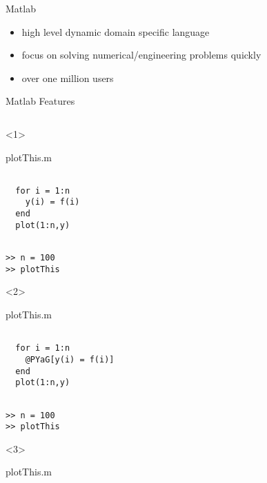 
\begin{frame}{Matlab}


\begin{itemize}
\pause \item high level dynamic domain specific language
\pause \item focus on solving numerical/engineering problems quickly
\pause \item over one million users
\end{itemize}

\end{frame}
\begin{frame}[fragile]{Matlab Features}
  \begin{columns}
    \begin{column}[T]{5cm}
      \begin{onlyenv}<1>
        \begin{block}{plotThis.m}
          \begin{Verbatim}[commandchars=@\[\]]

  for i = 1:n
    y(i) = f(i)
  end
  plot(1:n,y)
          \end{Verbatim}
        \end{block}
          \begin{Verbatim}[commandchars=@\[\]]

>> n = 100
>> plotThis
        \end{Verbatim}
      \end{onlyenv}
      \begin{onlyenv}<2>
        \begin{block}{plotThis.m}
          \begin{Verbatim}[commandchars=@\[\]]

  for i = 1:n
    @PYaG[y(i) = f(i)]
  end
  plot(1:n,y)
          \end{Verbatim}
        \end{block}
          \begin{Verbatim}[commandchars=@\[\]]

>> n = 100
>> plotThis
        \end{Verbatim}
      \end{onlyenv}
      \begin{onlyenv}<3>
        \begin{block}{plotThis.m}
          \begin{Verbatim}[commandchars=@\[\]]


\end{Verbatim}
\end{block}
\end{onlyenv}
\end{column}
\end{columns}
\end{frame}
